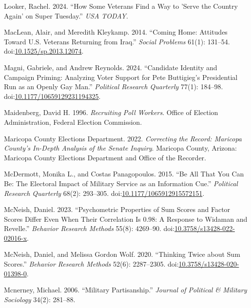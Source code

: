 \documentclass[
  12pt,
  letterpaper,
]{article}
\newlength{\cslhangindent}
\newenvironment{CSLReferences}[2] %
 {\begin{list}{}{%
  \setlength{\itemindent}{0pt}
  \setlength{\leftmargin}{0pt}
  \setlength{\parsep}{0pt}
  \ifodd #1
   \setlength{\leftmargin}{\cslhangindent}
   \setlength{\itemindent}{-1\cslhangindent}
  \fi
  \setlength{\itemsep}{#2\baselineskip}}}
 {\end{list}}
\begin{document}
\begin{CSLReferences}{1}{1}
Looker, Rachel. 2024. {``How Some Veterans Find a Way to 'Serve the
Country Again' on {Super Tuesday}.''} \emph{USA TODAY}.

MacLean, Alair, and Meredith Kleykamp. 2014. {``Coming {Home}:
{Attitudes} Toward {U}.{S}. {Veterans Returning} from {Iraq}.''}
\emph{Social Problems} 61(1): 131--54.
doi:\href{https://doi.org/10.1525/sp.2013.12074}{10.1525/sp.2013.12074}.

Magni, Gabriele, and Andrew Reynolds. 2024. {``Candidate {Identity} and
{Campaign Priming}: {Analyzing Voter Support} for {Pete Buttigieg}'s
{Presidential Run} as an {Openly Gay Man}.''} \emph{Political Research
Quarterly} 77(1): 184--98.
doi:\href{https://doi.org/10.1177/10659129231194325}{10.1177/10659129231194325}.

Maidenberg, David H. 1996. \emph{Recruiting {Poll Workers}}. Office of
Election Administration, Federal Election Commission.

Maricopa County Elections Department. 2022. \emph{Correcting the
{Record}: {Maricopa County}'s {In-Depth Analysis} of the {Senate
Inquiry}}. Maricopa County, Arizona: {Maricopa County Elections
Department and Office of the Recorder}.

McDermott, Monika L., and Costas Panagopoulos. 2015. {``Be {All} That
{You Can Be}: {The Electoral Impact} of {Military Service} as an
{Information Cue}.''} \emph{Political Research Quarterly} 68(2):
293--305.
doi:\href{https://doi.org/10.1177/1065912915572151}{10.1177/1065912915572151}.

McNeish, Daniel. 2023. {``Psychometric Properties of Sum Scores and
Factor Scores Differ Even When Their Correlation Is 0.98: {A} Response
to {Widaman} and {Revelle}.''} \emph{Behavior Research Methods} 55(8):
4269--90.
doi:\href{https://doi.org/10.3758/s13428-022-02016-x}{10.3758/s13428-022-02016-x}.

McNeish, Daniel, and Melissa Gordon Wolf. 2020. {``Thinking Twice about
Sum Scores.''} \emph{Behavior Research Methods} 52(6): 2287--2305.
doi:\href{https://doi.org/10.3758/s13428-020-01398-0}{10.3758/s13428-020-01398-0}.

Mcnerney, Michael. 2006. {``Military {Partisanship}.''} \emph{Journal of
Political \& Military Sociology} 34(2): 281--88.


\end{CSLReferences}
\end{document}
